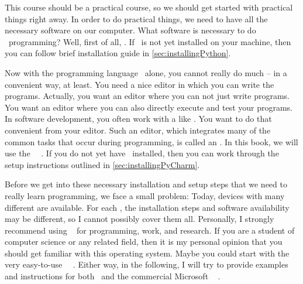 %
%
This course should be a practical course, so we should get started with practical things right away.
In order to do practical things, we need to have all the necessary software on our computer.
What software is necessary to do \python\ programming?
Well, first of all, \python.
If \python\ is not yet installed on your machine, then you can follow brief installation guide in \cref{sec:installingPython}.

Now with the programming language \python\ alone, you cannot really do much -- in a convenient way, at least.
You need a nice editor in which you can write the programs.
Actually, you want an editor where you can not just write programs.
You want an editor  where you can also directly execute and test your programs.
In software development, you often work with a  like \git.
You want to do that convenient from your editor.
Such an editor, which integrates many of the common tasks that occur during programming, is called an .
In this book, we will use the \pycharm\ ~\cite{VHN2023HOADWP}.
If you do not yet have \pycharm\ installed, then you can work through the setup instructions outlined in \cref{sec:installingPyCharm}.

Before we get into these necessary installation and setup steps that we need to really learn programming, we face a small problem:
Today, devices with many different  are available.
For each , the installation steps and software availability may be different, so I cannot possibly cover them all.
Personally, I strongly recommend using \linux~\cite{T1999TLE} for programming, work, and research.
If you are a student of computer science or any related field, then it is my personal opinion that you should get familiar with this operating system.
Maybe you could start with the very easy-to-use \ubuntu\ \linux~\cite{CN2020ULB}.
Either way, in the following, I will try to provide examples and instructions for both \ubuntu\ and the commercial Microsoft \windows~\cite{B2023W1IO} .
%
%
%
%
\endhsection%
%
